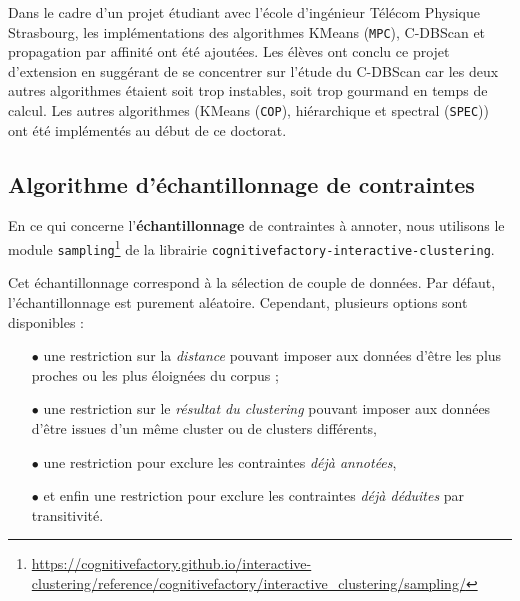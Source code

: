 		\begin{leftBarInformation}
			Dans le cadre d'un projet étudiant avec l'école d'ingénieur Télécom Physique Strasbourg, les implémentations des algorithmes  KMeans (\texttt{MPC}), C-DBScan et propagation par affinité ont été ajoutées. Les élèves ont conclu ce projet d'extension en suggérant de se concentrer sur l'étude du C-DBScan car les deux autres algorithmes étaient soit trop instables, soit trop gourmand en temps de calcul.
			Les autres algorithmes (KMeans (\texttt{COP}), hiérarchique et spectral (\texttt{SPEC})) ont été implémentés au début de ce doctorat.
		\end{leftBarInformation}
		
		
		\subsection{Algorithme d'échantillonnage de contraintes}
		\label{section:3.3.4-ALGORITHMES-ECHANTILLONNAGE-DE-CONTRAINTES}
		
		En ce qui concerne l'\textbf{échantillonnage} de contraintes à annoter, nous utilisons le module \texttt{sampling}\footnote{\url{https://cognitivefactory.github.io/interactive-clustering/reference/cognitivefactory/interactive_clustering/sampling/}} de la librairie \texttt{cognitivefactory-interactive-clustering}.
		
		Cet échantillonnage correspond à la sélection de couple de données.
		Par défaut, l'échantillonnage est purement aléatoire.
		Cependant, plusieurs options sont disponibles :
		
		\begin{itemize}
			\item[\(\bullet\)] une restriction sur la \textit{distance} pouvant imposer aux données d'être les plus proches ou les plus éloignées du corpus ;
			\item[\(\bullet\)] une restriction sur le \textit{résultat du clustering} pouvant imposer aux données d'être issues d'un même cluster ou de clusters différents,
			\item[\(\bullet\)] une restriction pour exclure les contraintes \textit{déjà annotées},
			\item[\(\bullet\)] et enfin une restriction pour exclure les contraintes \textit{déjà déduites} par transitivité.
		\end{itemize}
		
